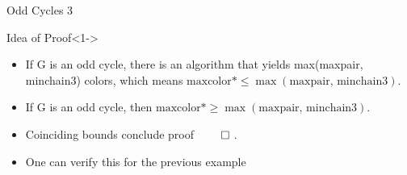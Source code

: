 \begin{frame}{Odd Cycles 3}
  \begin{block}{Idea of Proof}<1->
    \begin{itemize}
      \item<2-> If G is an odd cycle, there is an algorithm
      that yields max(maxpair, minchain3) colors, which 
      means $\text{maxcolor*} \leq \max(\text{maxpair, minchain3})$.
      \null
      \null
      \item<3-> If G is an odd cycle, then $\text{maxcolor*} \ge \max(\text{maxpair, minchain3})$.
      \null
      \null
      \item<4-> Coinciding bounds conclude proof \cite{main_paper} $\qed$ .
      \item<5-> One can verify this for the previous example
    \end{itemize}
  \end{block}
  

\end{frame}